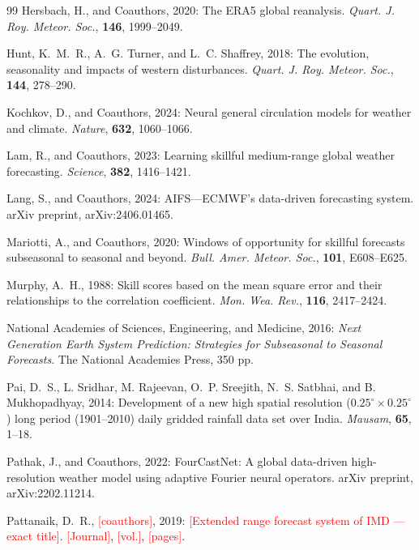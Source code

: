 \documentclass[11pt]{article}
\newcommand{\ph}[1]{\textcolor{red}{[#1]}}
\begin{document}
\begin{thebibliography}{99}
Hersbach, H., and Coauthors, 2020: The ERA5 global reanalysis.
\textit{Quart. J. Roy. Meteor. Soc.}, \textbf{146}, 1999--2049.

Hunt, K.~M.~R., A.~G. Turner, and L.~C. Shaffrey, 2018: The evolution,
seasonality and impacts of western disturbances. \textit{Quart. J.
Roy. Meteor. Soc.}, \textbf{144}, 278--290.

Kochkov, D., and Coauthors, 2024: Neural general circulation models
for weather and climate. \textit{Nature}, \textbf{632}, 1060--1066.

Lam, R., and Coauthors, 2023: Learning skillful medium-range global
weather forecasting. \textit{Science}, \textbf{382}, 1416--1421.

Lang, S., and Coauthors, 2024: AIFS---ECMWF's data-driven forecasting
system. arXiv preprint, arXiv:2406.01465. %

Mariotti, A., and Coauthors, 2020: Windows of opportunity for skillful
forecasts subseasonal to seasonal and beyond. \textit{Bull. Amer.
Meteor. Soc.}, \textbf{101}, E608--E625.

Murphy, A.~H., 1988: Skill scores based on the mean square error and
their relationships to the correlation coefficient. \textit{Mon. Wea.
Rev.}, \textbf{116}, 2417--2424.

National Academies of Sciences, Engineering, and Medicine, 2016:
\textit{Next Generation Earth System Prediction: Strategies for
Subseasonal to Seasonal Forecasts}. The National Academies Press,
350 pp. %

Pai, D.~S., L. Sridhar, M. Rajeevan, O.~P. Sreejith, N.~S. Satbhai,
and B. Mukhopadhyay, 2014: Development of a new high spatial
resolution ($0.25^{\circ} \times 0.25^{\circ}$) long period
(1901--2010) daily gridded rainfall data set over India.
\textit{Mausam}, \textbf{65}, 1--18.

Pathak, J., and Coauthors, 2022: FourCastNet: A global data-driven
high-resolution weather model using adaptive Fourier neural
operators. arXiv preprint, arXiv:2202.11214.

Pattanaik, D.~R., \ph{coauthors}, 2019: \ph{Extended range forecast
system of IMD --- exact title}. \ph{Journal}, \ph{vol.},
\ph{pages}. %


\end{thebibliography}
\end{document}
